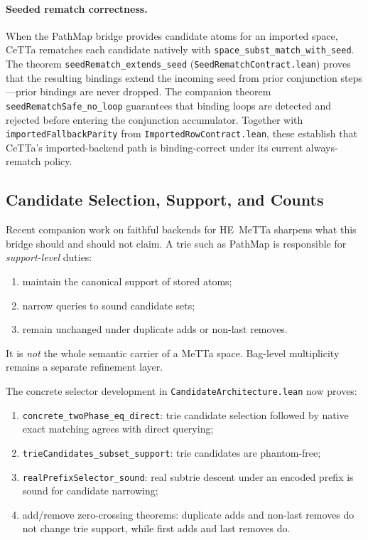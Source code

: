 \documentclass[11pt]{article}
\theoremstyle{definition}
\theoremstyle{remark}
\newcommand{\MeTTa}{\textup{MeTTa}}
\newcommand{\HE}{\textup{HE}}
\newcommand{\CeTTa}{\textup{CeTTa}}
\newcommand{\PathMap}{\textup{PathMap}}
\begin{document}
\paragraph{Seeded rematch correctness.}
When the PathMap bridge provides candidate atoms for an imported space,
\CeTTa{} rematches each candidate natively with \texttt{space\_subst\_match\_with\_seed}.
The theorem \texttt{seedRematch\_extends\_seed} (\texttt{SeedRematchContract.lean})
proves that the resulting bindings extend the incoming seed from prior
conjunction steps---prior bindings are never dropped.  The companion theorem
\texttt{seedRematchSafe\_no\_loop} guarantees that binding loops are detected
and rejected before entering the conjunction accumulator.  Together with
\texttt{importedFallbackParity} from \texttt{ImportedRowContract.lean},
these establish that \CeTTa{}'s imported-backend path is binding-correct
under its current always-rematch policy.

\subsection{Candidate Selection, Support, and Counts}

Recent companion work on faithful backends for \HE{}~\MeTTa{} sharpens what
this bridge should and should not claim.  A trie such as \PathMap{} is
responsible for \emph{support-level} duties:
\begin{enumerate}[nosep]
  \item maintain the canonical support of stored atoms;
  \item narrow queries to sound candidate sets;
  \item remain unchanged under duplicate adds or non-last removes.
\end{enumerate}
It is \emph{not} the whole semantic carrier of a MeTTa space.  Bag-level
multiplicity remains a separate refinement layer.

The concrete selector development in
\texttt{CandidateArchitecture.lean} now proves:
\begin{enumerate}[nosep]
  \item \texttt{concrete\_twoPhase\_eq\_direct}: trie candidate selection
        followed by native exact matching agrees with direct querying;
  \item \texttt{trieCandidates\_subset\_support}: trie candidates are
        phantom-free;
  \item \texttt{realPrefixSelector\_sound}: real subtrie descent under an
        encoded prefix is sound for candidate narrowing;
  \item add/remove zero-crossing theorems: duplicate adds and non-last
        removes do not change trie support, while first adds and last
        removes do.
\end{enumerate}
\end{document}
